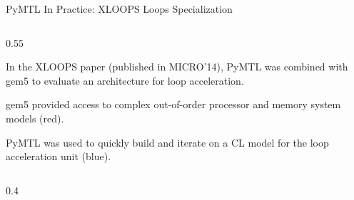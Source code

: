 \begin{frame}{PyMTL In Practice: XLOOPS Loops Specialization}

  \begin{cbxcols}
  \begin{column}{0.55\tw}

\begin{cbxlist}

  \1 In the XLOOPS paper (published in MICRO'14), PyMTL was combined with
     gem5 to evaluate an architecture for loop acceleration.

  \1 gem5 provided access to complex out-of-order processor and memory
     system models (red).

  \1 PyMTL was used to quickly build and iterate on a CL model for the
     loop acceleration unit (blue).

\end{cbxlist}

  \smallskip\smallskip
  {\footnotesize{}\par}

  \end{column}
  \begin{column}{0.4\tw}


  \end{column}
  \end{cbxcols}

\end{frame}

